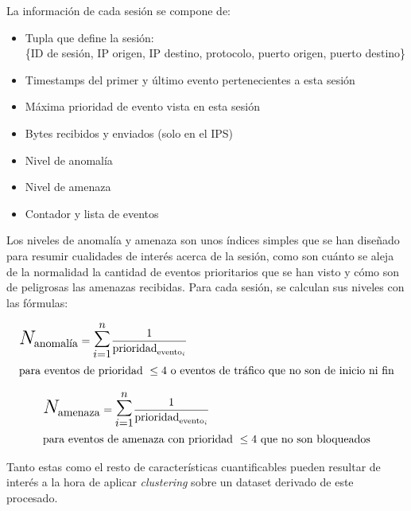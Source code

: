 La información de cada sesión se compone de:
\begin{itemize}
    \item Tupla que define la sesión:\\\{ID de sesión, IP origen, IP destino, protocolo, puerto origen, puerto destino\}
    \item Timestamps del primer y último evento pertenecientes a esta sesión
    \item Máxima prioridad de evento vista en esta sesión
    \item Bytes recibidos y enviados (solo en el IPS)
    \item Nivel de anomalía
    \item Nivel de amenaza
    \item Contador y lista de eventos
\end{itemize}

Los niveles de anomalía y amenaza son unos índices simples que se han diseñado para resumir cualidades de interés acerca de la sesión, como son
cuánto se aleja de la normalidad la cantidad de eventos prioritarios que se han visto y cómo son de peligrosas las amenazas recibidas.
Para cada sesión, se calculan sus niveles con las fórmulas:

\begin{eqnarray*}
    & \mathlarger{\mathlarger{\mathlarger{N}}}_{\textrm{anomalía}} = \mathlarger{\mathlarger{\mathlarger{\sum}}}_{i=1}^{n} \frac{1}{\textrm{prioridad}_{\textrm{evento}_i}}\\
    & \textrm{para eventos de prioridad }\leq4\textrm{ o eventos de tráfico que no son de inicio ni fin}
\end{eqnarray*}

\begin{eqnarray*}
    & \mathlarger{\mathlarger{\mathlarger{N}}}_{\textrm{amenaza}} = \mathlarger{\mathlarger{\mathlarger{\sum}}}_{i=1}^{n} \frac{1}{\textrm{prioridad}_{\textrm{evento}_i}}\\
    & \textrm{para eventos de amenaza con prioridad }\leq4\textrm{ que no son bloqueados}
\end{eqnarray*}

Tanto estas como el resto de características cuantificables pueden resultar de interés a la hora de aplicar \emph{clustering} sobre un dataset derivado de este procesado.

